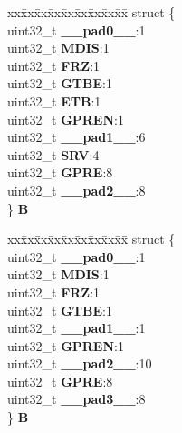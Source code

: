 \begin{DoxyCompactItemize}
\begin{tabbing}
\end{tabbing}\item 
\mbox{\label{unionEMIOS__tag_1_1EMIOS__MCR__tag_a503d51c32e648be823451f4341eb4396}} 
\begin{tabbing}
xx\=xx\=xx\=xx\=xx\=xx\=xx\=xx\=xx\=\kill
struct \{\\
\>uint32\_t {\bfseries \_\_pad0\_\_}:1\\
\>uint32\_t {\bfseries MDIS}:1\\
\>uint32\_t {\bfseries FRZ}:1\\
\>uint32\_t {\bfseries GTBE}:1\\
\>uint32\_t {\bfseries ETB}:1\\
\>uint32\_t {\bfseries GPREN}:1\\
\>uint32\_t {\bfseries \_\_pad1\_\_}:6\\
\>uint32\_t {\bfseries SRV}:4\\
\>uint32\_t {\bfseries GPRE}:8\\
\>uint32\_t {\bfseries \_\_pad2\_\_}:8\\
\} {\bfseries B}\\

\end{tabbing}\item 
\mbox{\label{unionEMIOS__tag_1_1EMIOS__MCR__tag_a900c53e5e9b8e7138a31e807bd7926d0}} 
\begin{tabbing}
xx\=xx\=xx\=xx\=xx\=xx\=xx\=xx\=xx\=\kill
struct \{\\
\>uint32\_t {\bfseries \_\_pad0\_\_}:1\\
\>uint32\_t {\bfseries MDIS}:1\\
\>uint32\_t {\bfseries FRZ}:1\\
\>uint32\_t {\bfseries GTBE}:1\\
\>uint32\_t {\bfseries \_\_pad1\_\_}:1\\
\>uint32\_t {\bfseries GPREN}:1\\
\>uint32\_t {\bfseries \_\_pad2\_\_}:10\\
\>uint32\_t {\bfseries GPRE}:8\\
\>uint32\_t {\bfseries \_\_pad3\_\_}:8\\
\} {\bfseries B}\\


\end{tabbing}
\end{DoxyCompactItemize}
